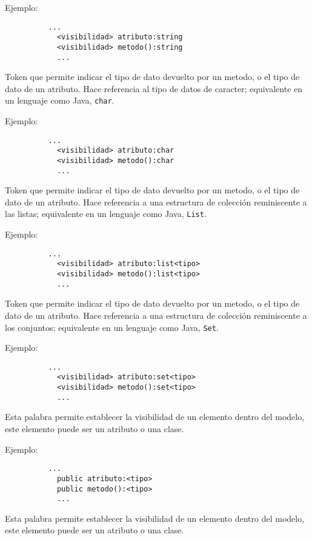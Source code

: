 \begin{description}[align=right,labelwidth=2.5cm]
	Ejemplo:
		\begin{lstlisting}
		  ...
			<visibilidad> atributo:string
			<visibilidad> metodo():string
			...
		\end{lstlisting}

\item [char] Token que permite indicar el tipo de dato devuelto por un metodo, o
	el tipo de dato de un atributo. Hace referencia al tipo de
	datos de caracter; equivalente en un lenguaje como Java, \texttt{char}.

	Ejemplo:
		\begin{lstlisting}
		  ...
			<visibilidad> atributo:char
			<visibilidad> metodo():char
			...
		\end{lstlisting}

\item [list] Token que permite indicar el tipo de dato devuelto por un metodo, o
	el tipo de dato de un atributo. Hace referencia a una
	estructura de colección reminiscente a las listas; equivalente en un lenguaje
	como Java, \texttt{List}.

	Ejemplo:
		\begin{lstlisting}
		  ...
			<visibilidad> atributo:list<tipo>
			<visibilidad> metodo():list<tipo>
			...
		\end{lstlisting}

\item[set] Token que permite indicar el tipo de dato devuelto por un metodo, o
	el tipo de dato de un atributo. Hace referencia a una
	estructura de colección reminiscente a los conjuntos; equivalente en un lenguaje
	como Java, \texttt{Set}.

	Ejemplo:
		\begin{lstlisting}
		  ...
			<visibilidad> atributo:set<tipo>
			<visibilidad> metodo():set<tipo>
			...
		\end{lstlisting}

\item [public] Esta palabra permite establecer la visibilidad de un elemento
	dentro del modelo, este elemento puede ser un atributo o una clase.

	Ejemplo:
		\begin{lstlisting}
		  ...
			public atributo:<tipo>
			public metodo():<tipo>
			...
		\end{lstlisting}

\item [private] Esta palabra permite establecer la visibilidad de un elemento
	dentro del modelo, este elemento puede ser un atributo o una clase.


\end{description}
